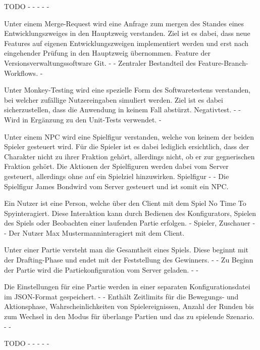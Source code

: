 {TODO}
{-}
{-}
{-}
{-}
{-}

{Unter einem Merge-Request wird eine Anfrage zum \glqq mergen \grqq des Standes eines Entwicklungszweiges in den Hauptzweig verstanden. Ziel ist es dabei, dass neue Features auf eigenen Entwicklungszweigen implementiert werden und erst nach eingehender Prüfung in den Hauptzweig übernommen.}
{Feature der Versionsverwaltungssoftware Git.}
{-}
{-}
{Zentraler Bestandteil des Feature-Branch-Workflows.}
{-}

{Unter Monkey-Testing wird eine spezielle Form des Softwaretestens verstanden, bei welcher zufällige Nutzereingaben simuliert werden. Ziel ist es dabei sicherzustellen, dass die Anwendung in keinem Fall abstürzt.}
{Negativtest.}
{-}
{-}
{Wird in Ergänzung zu den Unit-Tests verwendet.}
{-}

{Unter einem NPC wird eine Spielfigur verstanden, welche von keinem der beiden Spieler gesteuert wird. Für die Spieler ist es dabei lediglich ersichtlich, dass der Charakter nicht zu ihrer Fraktion gehört, allerdings nicht, ob er zur gegnerischen Fraktion gehört. Die Aktionen der Spielfiguren werden dabei vom Server gesteuert, allerdings ohne auf ein Spielziel hinzuwirken.}
{Spielfigur}
{-}
{-}
{Die Spielfigur \glqq James Bond\grqq wird vom Server gesteuert und ist somit ein NPC.}

{Ein Nutzer ist eine Person, welche über den Client mit dem Spiel  \glqq No Time To Spy\grqq interagiert. Diese Interaktion kann durch Bedienen des Konfigurators, Spielen des Spiels oder Beobachten einer laufenden Partie erfolgen.}
{-}
{Spieler, Zuschauer}
{-}
{-}
{Der Nutzer \glqq Max Mustermann\grqq interagiert mit dem Client.}

{Unter einer Partie versteht man die Gesamtheit eines Spiels. Diese beginnt mit der Drafting-Phase und endet mit der Feststellung des Gewinners.}
{-}
{-}
{Zu Beginn der Partie wird die Partiekonfiguration vom Server geladen.}
{-}
{-}

{Die Einstellungen für eine Partie werden in einer separaten Konfigurationsdatei im JSON-Format gespeichert. }
{-}
{-}
{Enthält Zeitlimits für die Bewegungs- und Aktionsphase, Wahrscheinlichkeiten von Spielereignissen, Anzahl der Runden bis zum Wechsel in den Modus für überlange Partien und das zu spielende Szenario.}
{-}
{-}

{TODO}
{-}
{-}
{-}
{-}
{-}

